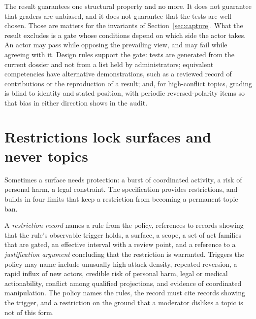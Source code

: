 \documentclass[11pt]{article}
\begin{document}
The result guarantees one structural property and no more. It does not guarantee that graders are unbiased, and it does not guarantee that the tests are well chosen. Those are matters for the invariants of Section~\ref{sec:capture}. What the result excludes is a gate whose conditions depend on which side the actor takes. An actor may pass while opposing the prevailing view, and may fail while agreeing with it. Design rules support the gate: tests are generated from the current dossier and not from a list held by administrators; equivalent competencies have alternative demonstrations, such as a reviewed record of contributions or the reproduction of a result; and, for high-conflict topics, grading is blind to identity and stated position, with periodic reversed-polarity items so that bias in either direction shows in the audit.

\section{Restrictions lock surfaces and never topics}\label{sec:restrictions}

Sometimes a surface needs protection: a burst of coordinated activity, a risk of personal harm, a legal constraint. The specification provides restrictions, and builds in four limits that keep a restriction from becoming a permanent topic ban.

A \emph{restriction record} names a rule from the policy, references to records showing that the rule's observable trigger holds, a surface, a scope, a set of act families that are gated, an effective interval with a review point, and a reference to a \emph{justification argument} concluding that the restriction is warranted. Triggers the policy may name include unusually high attack density, repeated reversion, a rapid influx of new actors, credible risk of personal harm, legal or medical actionability, conflict among qualified projections, and evidence of coordinated manipulation. The policy names the rules, the record must cite records showing the trigger, and a restriction on the ground that a moderator dislikes a topic is not of this form.
\end{document}
